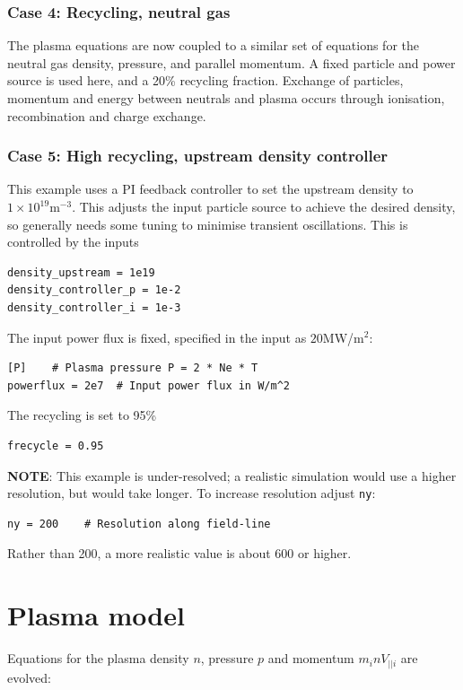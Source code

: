 \documentclass[12pt,a4paper]{article}
\begin{document}
\subsubsection{Case 4: Recycling, neutral gas}

The plasma equations are now coupled to a similar set of equations for the neutral gas density, pressure, and parallel momentum. A fixed particle and power source is used here, and a 20\% recycling fraction. Exchange of particles, momentum and energy between neutrals and plasma occurs through ionisation, recombination and charge exchange.

\subsubsection{Case 5: High recycling, upstream density controller}

This example uses a PI feedback controller to set the upstream density to $1\times 10^{19}$m$^{-3}$. This adjusts the input particle source to achieve the desired density, so generally needs some tuning to minimise transient oscillations. This is controlled by the inputs
\begin{verbatim}
density_upstream = 1e19
density_controller_p = 1e-2
density_controller_i = 1e-3
\end{verbatim}
The input power flux is fixed, specified in the input as $20$MW/m$^2$:
\begin{verbatim}
[P]    # Plasma pressure P = 2 * Ne * T
powerflux = 2e7  # Input power flux in W/m^2
\end{verbatim}
The recycling is set to 95\%
\begin{verbatim}
frecycle = 0.95
\end{verbatim}

{\bf NOTE}: This example is under-resolved; a realistic simulation would use a higher resolution, but would take longer. To increase resolution adjust \texttt{ny}:
\begin{verbatim}
ny = 200    # Resolution along field-line
\end{verbatim}
Rather than 200, a more realistic value is about 600 or higher.

\section{Plasma model}

Equations for the plasma density $n$, pressure $p$ and momentum $m_inV_{||i}$ are evolved:
\end{document}
